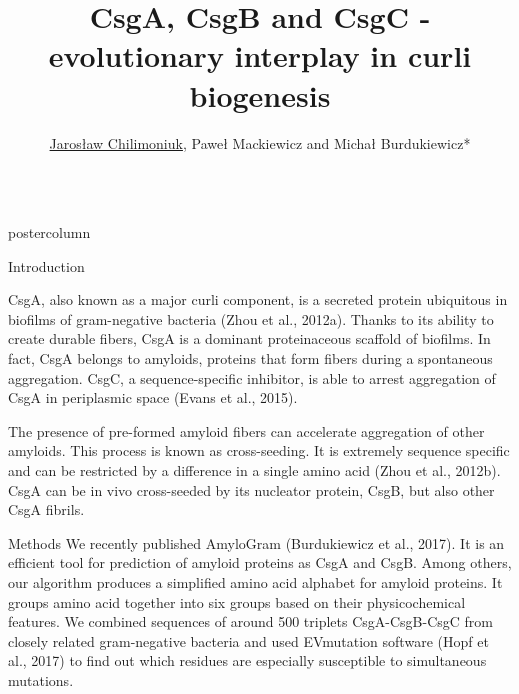 \documentclass[final]{beamer}\usepackage[]{graphicx}\usepackage[]{color}
\newlength{\columnheight}
\begin{document}
\date{}

\author{\large \underline{Jaros\l{}aw Chilimoniuk}, Pawe\l{} Mackiewicz and Micha\l{} Burdukiewicz*\\
\bigskip
{}}


\title{\huge CsgA, CsgB and CsgC - evolutionary interplay in curli biogenesis}

\begin{frame}
\begin{columns}
\begin{column}{.50\textwidth}
\begin{beamercolorbox}[center,wd=\textwidth]{postercolumn}
\begin{minipage}[T]{.95\textwidth}
\parbox[t][\columnheight]{\textwidth}
{
\begin{block}{Introduction}


  

CsgA, also known as a major curli component, is a secreted protein ubiquitous in biofilms of gram-negative bacteria (Zhou et al., 2012a). Thanks to its ability to create durable fibers, CsgA is a dominant proteinaceous scaffold of biofilms. In fact, CsgA belongs to amyloids, proteins that form fibers during a spontaneous aggregation. CsgC, a sequence-specific inhibitor, is able to arrest aggregation of CsgA in periplasmic space (Evans et al., 2015).

The presence of pre-formed amyloid fibers can accelerate aggregation of other amyloids. This process is known as cross-seeding. It is extremely sequence specific and can be restricted by a difference in a single amino acid (Zhou et al., 2012b). CsgA can be in vivo cross-seeded by its nucleator protein, CsgB, but also other CsgA fibrils.
\end{block}


  \begin{block}{Methods}
  We recently published AmyloGram (Burdukiewicz et al., 2017). It is an efficient tool for prediction of amyloid proteins as CsgA and CsgB. Among others, our algorithm produces a simplified amino acid alphabet for amyloid proteins. It groups amino acid together into six groups based on their physicochemical features. We combined sequences of around 500 triplets CsgA-CsgB-CsgC from closely related gram-negative bacteria and used EVmutation software (Hopf et al., 2017) to find out which residues are especially susceptible to simultaneous mutations. 
\end{block}


}
\end{minipage}
\end{beamercolorbox}
\end{column}
\end{columns}
\end{frame}
\end{document}
